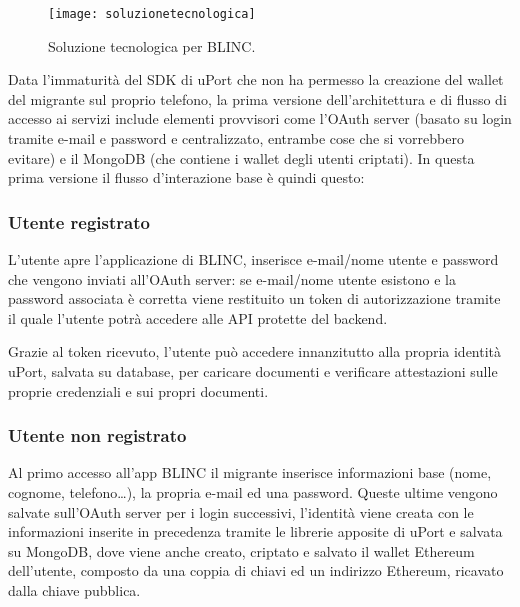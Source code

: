 \begin{figure}[!ht]
    \texttt{[image: soluzionetecnologica]}
    \caption{Soluzione tecnologica per BLINC.}
    \label{fig:soluzionetecnologica}
\end{figure}

Data l’immaturità del SDK di uPort che non ha permesso la creazione del wallet del migrante sul proprio telefono, la prima versione 
dell’architettura e di flusso di accesso ai servizi include elementi provvisori come l’OAuth server
(basato su login tramite e-mail e password e centralizzato, 
entrambe cose che si vorrebbero evitare) e il MongoDB (che contiene i wallet degli utenti criptati).	
In questa prima versione il flusso d’interazione base è quindi questo:

\subsubsection{Utente registrato}

L’utente apre l’applicazione di BLINC, inserisce e-mail/nome utente e password che vengono inviati all’OAuth server:
se e-mail/nome utente esistono e la password associata è corretta viene restituito un token di autorizzazione tramite il quale l’utente
potrà accedere alle API protette del backend.

Grazie al token ricevuto, l’utente può accedere innanzitutto alla propria identità uPort, salvata su database, 
per caricare documenti e verificare attestazioni sulle proprie credenziali e sui propri documenti.


\subsubsection{Utente non registrato}

Al primo accesso all’app BLINC il migrante inserisce informazioni base (nome, cognome, telefono…),
la propria e-mail ed una password. Queste ultime vengono salvate sull’OAuth server per i login successivi, 
l’identità viene creata con le informazioni inserite in precedenza tramite le librerie apposite di uPort 
e salvata su MongoDB, dove viene anche creato, criptato e salvato il wallet Ethereum dell’utente,
composto da una coppia di chiavi ed un indirizzo Ethereum, ricavato dalla chiave pubblica.
